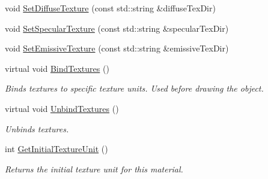 \begin{DoxyCompactItemize}
void \mbox{\hyperlink{class_geometry_engine_1_1_geometry_material_1_1_alpha_multi_texture_material_a33aeca61962b7b025658f66412e84e29}{Set\+Diffuse\+Texture}} (const std\+::string \&diffuse\+Tex\+Dir)
\item 
void \mbox{\hyperlink{class_geometry_engine_1_1_geometry_material_1_1_alpha_multi_texture_material_a31ee89561f985b0323397cffc4486262}{Set\+Specular\+Texture}} (const std\+::string \&specular\+Tex\+Dir)
\item 
void \mbox{\hyperlink{class_geometry_engine_1_1_geometry_material_1_1_alpha_multi_texture_material_a036d9058b272dfd5ebb8da8c8b332b46}{Set\+Emissive\+Texture}} (const std\+::string \&emissive\+Tex\+Dir)
\item 
\mbox{\label{class_geometry_engine_1_1_geometry_material_1_1_alpha_multi_texture_material_ae146a684fbdf40efd022973e398c429a}} 
virtual void \mbox{\hyperlink{class_geometry_engine_1_1_geometry_material_1_1_alpha_multi_texture_material_ae146a684fbdf40efd022973e398c429a}{Bind\+Textures}} ()
\begin{DoxyCompactList}\small\item\em Binds textures to specific texture units. Used before drawing the object. \end{DoxyCompactList}\item 
\mbox{\label{class_geometry_engine_1_1_geometry_material_1_1_alpha_multi_texture_material_a712e017a01c22bc330cbd9945257a7a8}} 
virtual void \mbox{\hyperlink{class_geometry_engine_1_1_geometry_material_1_1_alpha_multi_texture_material_a712e017a01c22bc330cbd9945257a7a8}{Unbind\+Textures}} ()
\begin{DoxyCompactList}\small\item\em Unbinds textures. \end{DoxyCompactList}\item 
\mbox{\label{class_geometry_engine_1_1_geometry_material_1_1_alpha_multi_texture_material_acb002f9d22a63e29955556988275b2c9}} 
int \mbox{\hyperlink{class_geometry_engine_1_1_geometry_material_1_1_alpha_multi_texture_material_acb002f9d22a63e29955556988275b2c9}{Get\+Initial\+Texture\+Unit}} ()
\begin{DoxyCompactList}\small\item\em Returns the initial texture unit for this material. \end{DoxyCompactList}\end{DoxyCompactItemize}
